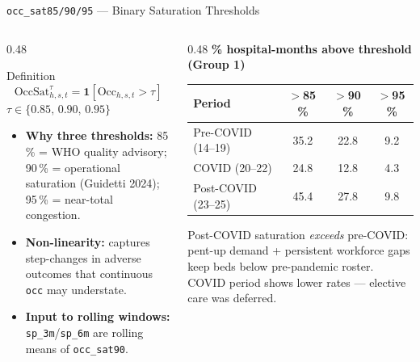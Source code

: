 \documentclass[aspectratio=169]{beamer}
\begin{document}
\begin{frame}{\texttt{occ\_sat85/90/95} --- Binary Saturation Thresholds}
  \begin{columns}[T]
    \begin{column}{0.48\textwidth}
      \begin{definitionbox}{Definition}
        \[
          \text{OccSat}^\tau_{h,s,t}
            = \mathbf{1}[\text{Occ}_{h,s,t} > \tau]
        \]
        \centering\scriptsize$\tau \in \{0.85,\,0.90,\,0.95\}$
      \end{definitionbox}
      \smallskip
      \begin{itemize}\scriptsize\setlength{\itemsep}{3pt}
        \item \textbf{Why three thresholds:}
              85\,\% = WHO quality advisory;
              90\,\% = operational saturation (Guidetti 2024);
              95\,\% = near-total congestion.
        \item \textbf{Non-linearity:} captures step-changes in adverse
              outcomes that continuous \texttt{occ} may understate.
        \item \textbf{Input to rolling windows:} \texttt{sp\_3m}/\texttt{sp\_6m}
              are rolling means of \texttt{occ\_sat90}.
      \end{itemize}
    \end{column}
    \begin{column}{0.48\textwidth}
      \textbf{\small\% hospital-months above threshold (Group 1)}
      \smallskip
      \begin{center}\scriptsize
        \begin{tabular}{lccc}
          \toprule
          Period & $>$85\,\% & $>$90\,\% & $>$95\,\% \\
          \midrule
          Pre-COVID (14--19) & 35.2 & 22.8 & 9.2 \\
          COVID (20--22)     & 24.8 & 12.8 & 4.3 \\
          Post-COVID (23--25)& 45.4 & 27.8 & 9.8 \\
          \bottomrule
        \end{tabular}
      \end{center}
      \smallskip
      \begin{keybox}
        \scriptsize
        Post-COVID saturation \emph{exceeds} pre-COVID: pent-up demand +
        persistent workforce gaps keep beds below pre-pandemic roster.
        COVID period shows lower rates --- elective care was deferred.
      \end{keybox}
    \end{column}
  \end{columns}
\end{frame}
\end{document}
